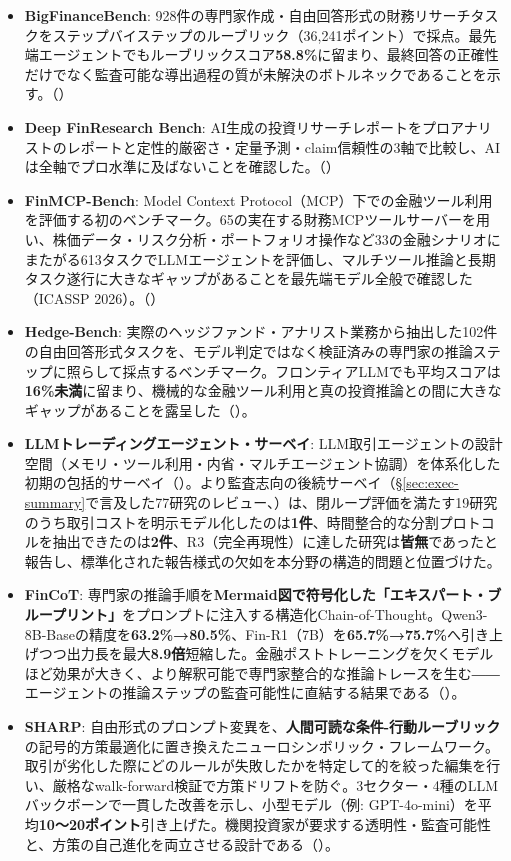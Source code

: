 \begin{itemize}
  \item \textbf{BigFinanceBench}: 928件の専門家作成・自由回答形式の財務リサーチタスクをステップバイステップのルーブリック（36,241ポイント）で採点。最先端エージェントでもルーブリックスコア\textbf{58.8\%}に留まり、最終回答の正確性だけでなく監査可能な導出過程の質が未解決のボトルネックであることを示す。（\cite{bigfinancebench2026}）
  \item \textbf{Deep FinResearch Bench}: AI生成の投資リサーチレポートをプロアナリストのレポートと定性的厳密さ・定量予測・claim信頼性の3軸で比較し、AIは全軸でプロ水準に及ばないことを確認した。（\cite{deepfinresearchbench2026}）
  \item \textbf{FinMCP-Bench}: Model Context Protocol（MCP）下での金融ツール利用を評価する初のベンチマーク。65の実在する財務MCPツールサーバーを用い、株価データ・リスク分析・ポートフォリオ操作など33の金融シナリオにまたがる613タスクでLLMエージェントを評価し、マルチツール推論と長期タスク遂行に大きなギャップがあることを最先端モデル全般で確認した（ICASSP 2026）。（\cite{finmcpbench2026}）
  \item \textbf{Hedge-Bench}: 実際のヘッジファンド・アナリスト業務から抽出した102件の自由回答形式タスクを、モデル判定ではなく検証済みの専門家の推論ステップに照らして採点するベンチマーク。フロンティアLLMでも平均スコアは\textbf{16\%未満}に留まり、機械的な金融ツール利用と真の投資推論との間に大きなギャップがあることを露呈した（\cite{hedgebench2026}）。
  \item \textbf{LLMトレーディングエージェント・サーベイ}: LLM取引エージェントの設計空間（メモリ・ツール利用・内省・マルチエージェント協調）を体系化した初期の包括的サーベイ（\cite{x04finagentsurvey2024}）。より監査志向の後続サーベイ（\S\ref{sec:exec-summary}で言及した77研究のレビュー、\cite{agentictrading2026}）は、閉ループ評価を満たす19研究のうち取引コストを明示モデル化したのは\textbf{1件}、時間整合的な分割プロトコルを抽出できたのは\textbf{2件}、R3（完全再現性）に達した研究は\textbf{皆無}であったと報告し、標準化された報告様式の欠如を本分野の構造的問題と位置づけた。
  \item \textbf{FinCoT}: 専門家の推論手順を\textbf{Mermaid図で符号化した「エキスパート・ブループリント」}をプロンプトに注入する構造化Chain-of-Thought。Qwen3-8B-Baseの精度を\textbf{63.2\%→80.5\%}、Fin-R1（7B）を\textbf{65.7\%→75.7\%}へ引き上げつつ出力長を最大\textbf{8.9倍}短縮した。金融ポストトレーニングを欠くモデルほど効果が大きく、より解釈可能で専門家整合的な推論トレースを生む――エージェントの推論ステップの監査可能性に直結する結果である（\cite{x04fincot2025}）。
  \item \textbf{SHARP}: 自由形式のプロンプト変異を、\textbf{人間可読な条件-行動ルーブリック}の記号的方策最適化に置き換えたニューロシンボリック・フレームワーク。取引が劣化した際にどのルールが失敗したかを特定して的を絞った編集を行い、厳格なwalk-forward検証で方策ドリフトを防ぐ。3セクター・4種のLLMバックボーンで一貫した改善を示し、小型モデル（例: GPT-4o-mini）を平均\textbf{10〜20ポイント}引き上げた。機関投資家が要求する透明性・監査可能性と、方策の自己進化を両立させる設計である（\cite{x04sharp2026}）。
\end{itemize}

